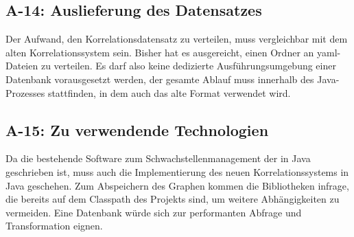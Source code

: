 
\subsection{A-14: Auslieferung des Datensatzes}\label{subsec:req-correlation-data-delivery}

Der Aufwand, den Korrelationsdatensatz zu verteilen, muss vergleichbar mit dem alten Korrelationssystem sein.
Bisher hat es ausgereicht, einen Ordner an \acrshort{yaml}-Dateien zu verteilen.
Es darf also keine dedizierte Ausführungsumgebung einer Datenbank vorausgesetzt werden, der gesamte Ablauf muss innerhalb des Java-Prozesses stattfinden, in dem auch das alte Format verwendet wird.

\subsection{A-15: Zu verwendende Technologien}\label{subsec:req-lang-java}

Da die bestehende Software zum Schwachstellenmanagement der \metaeffektsp in Java geschrieben ist, muss auch die Implementierung des neuen Korrelationssystems in Java geschehen.
Zum Abspeichern des Graphen kommen die Bibliotheken infrage, die bereits auf dem Classpath des Projekts sind, um weitere Abhängigkeiten zu vermeiden.
Eine Datenbank würde sich zur performanten Abfrage und Transformation eignen.
